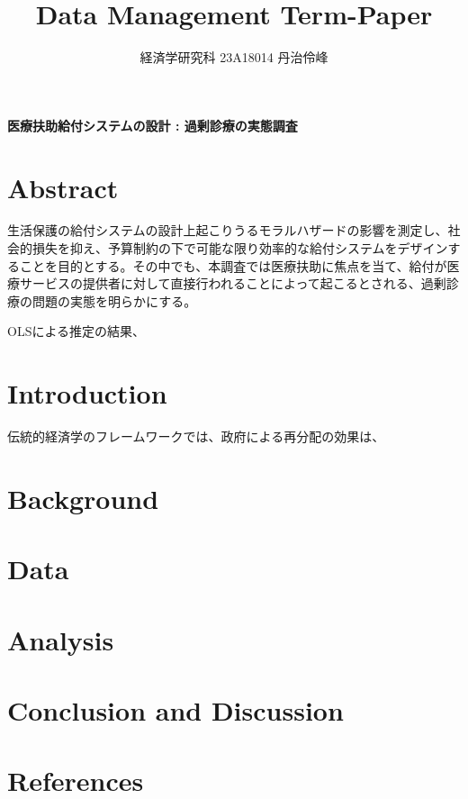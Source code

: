 \documentclass{jsarticle}
\begin{document}
\title{Data Management Term-Paper}
\author{経済学研究科 23A18014 丹治伶峰}
\date{}
\maketitle

\Large

\textbf{医療扶助給付システムの設計 : 過剰診療の実態調査}

\large

\section{Abstract}

生活保護の給付システムの設計上起こりうるモラルハザードの影響を測定し、社会的損失を抑え、予算制約の下で可能な限り効率的な給付システムをデザインすることを目的とする。その中でも、本調査では医療扶助に焦点を当て、給付が医療サービスの提供者に対して直接行われることによって起こるとされる、過剰診療の問題の実態を明らかにする。

OLSによる推定の結果、

\section{Introduction}

伝統的経済学のフレームワークでは、政府による再分配の効果は、

\section{Background}



\section{Data}



\section{Analysis}



\section{Conclusion and Discussion}



\section{References}
\end{document}
